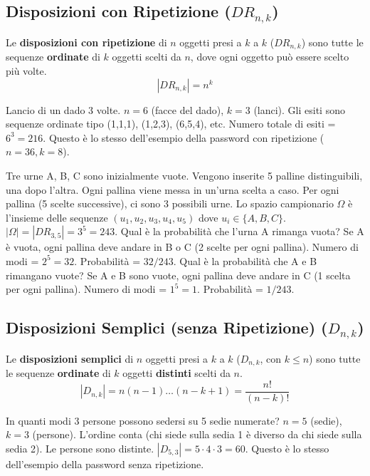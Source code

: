 \subsection{Disposizioni con Ripetizione ($DR_{n,k}$)}
\begin{definition}
Le \textbf{disposizioni con ripetizione} di $n$ oggetti presi a $k$ a $k$ ($DR_{n,k}$) sono tutte le sequenze \textbf{ordinate} di $k$ oggetti scelti da $n$, dove ogni oggetto può essere scelto più volte.
$$ |DR_{n,k}| = n^k $$
\end{definition}
\begin{example}
Lancio di un dado 3 volte. $n=6$ (facce del dado), $k=3$ (lanci).
Gli esiti sono sequenze ordinate tipo (1,1,1), (1,2,3), (6,5,4), etc.
Numero totale di esiti = $6^3 = 216$.
Questo è lo stesso dell'esempio della password con ripetizione ($n=36, k=8$).
\end{example}

\begin{example}
Tre urne A, B, C sono inizialmente vuote. Vengono inserite 5 palline distinguibili, una dopo l'altra. Ogni pallina viene messa in un'urna scelta a caso.
Per ogni pallina (5 scelte successive), ci sono 3 possibili urne.
Lo spazio campionario $\Omega$ è l'insieme delle sequenze $(u_1, u_2, u_3, u_4, u_5)$ dove $u_i \in \{A,B,C\}$.
$|\Omega| = |DR_{3,5}| = 3^5 = 243$.
Qual è la probabilità che l'urna A rimanga vuota?
Se A è vuota, ogni pallina deve andare in B o C (2 scelte per ogni pallina).
Numero di modi = $2^5 = 32$.
Probabilità = $32/243$.
Qual è la probabilità che A e B rimangano vuote?
Se A e B sono vuote, ogni pallina deve andare in C (1 scelta per ogni pallina).
Numero di modi = $1^5 = 1$.
Probabilità = $1/243$.
\end{example}

\subsection{Disposizioni Semplici (senza Ripetizione) ($D_{n,k}$)}
\begin{definition}
Le \textbf{disposizioni semplici} di $n$ oggetti presi a $k$ a $k$ ($D_{n,k}$, con $k \le n$) sono tutte le sequenze \textbf{ordinate} di $k$ oggetti \textbf{distinti} scelti da $n$.
$$ |D_{n,k}| = n(n-1)\dots(n-k+1) = \frac{n!}{(n-k)!} $$
\end{definition}
\begin{example}
In quanti modi 3 persone possono sedersi su 5 sedie numerate?
$n=5$ (sedie), $k=3$ (persone). L'ordine conta (chi siede sulla sedia 1 è diverso da chi siede sulla sedia 2). Le persone sono distinte.
$|D_{5,3}| = 5 \cdot 4 \cdot 3 = 60$.
Questo è lo stesso dell'esempio della password senza ripetizione.
\end{example}

